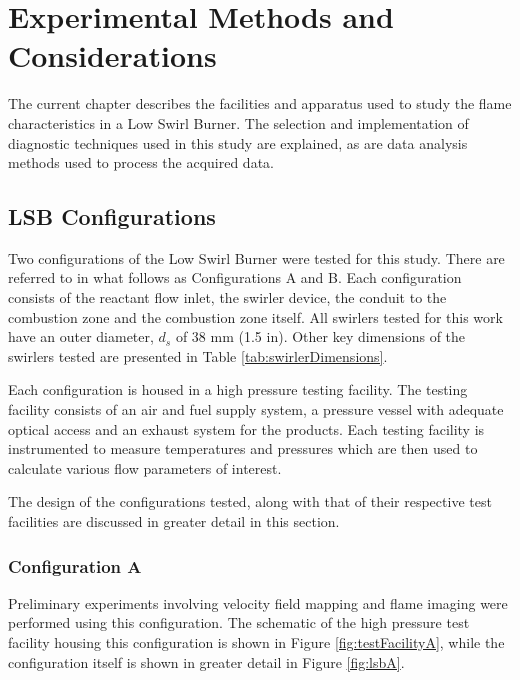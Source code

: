 \chapter{Experimental Methods and Considerations}
\label{ch:experimental}

The current chapter describes the facilities and apparatus used to study the flame characteristics in a Low Swirl Burner.
The selection and implementation of diagnostic techniques used in this study are explained, as are data analysis methods used to process the acquired data.

\section{LSB Configurations}
\label{sec:experimental-lsb-configurations}

Two configurations of the Low Swirl Burner were tested for this study.
There are referred to in what follows as Configurations A and B.
Each configuration consists of the reactant flow inlet, the swirler device, the conduit to the combustion zone and the combustion zone itself.
All swirlers tested for this work have an outer diameter, \(d_s\) of 38 mm (1.5 in).
Other key dimensions of the swirlers tested are presented in Table \ref{tab:swirlerDimensions}.

Each configuration is housed in a high pressure testing facility.
The testing facility consists of an air and fuel supply system, a pressure vessel with adequate optical access and an exhaust system for the products.
Each testing facility is instrumented to measure temperatures and pressures which are then used to calculate various flow parameters of interest.

The design of the configurations tested, along with that of their respective test facilities are discussed in greater detail in this section.



\subsection{Configuration A}
\label{subsec:lsb-configuration-a}

Preliminary experiments involving velocity field mapping and flame imaging were performed using this configuration.
The schematic of the high pressure test facility housing this configuration is shown in Figure \ref{fig:testFacilityA}, while the configuration itself is shown in greater detail in Figure \ref{fig:lsbA}.

